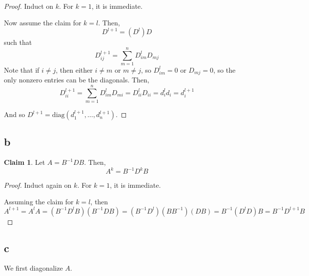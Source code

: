 \documentclass[12pt,letterpaper]{article}
\theoremstyle{definition}
\newtheorem*{claim}{Claim}
\newcommand{\diag}{\mathrm{diag}}
\begin{document}
\begin{proof}
  Induct on $k$. For $k = 1$, it is immediate.

  Now assume the claim for $k = l$. Then,
  \[
    D^{l+1} = (D^l)D
  \]
  such that
  \[
    D^{l+1}_{ij} = \sum_{m=1}^nD^l_{im}D_{mj}
  \]
  Note that if $i \neq j$, then either $i \neq m$ or $m \neq j$, so $D^l_{im} =
  0$ or $D_{mj} = 0$, so the only nonzero entries can be the diagonals. Then,
  \[
    D^{l+1}_{ii} = \sum_{m=1}^nD^l_{im}D_{mi} = D^l_{ii}D_{ii} = d_i^ld_i = d_i^{l+1}
  \]
  
  And so $D^{l+1} = \diag({d_1^{l+1},\dots, d_n^{l+1}})$.
  
\end{proof}

\subsection*{b}

\begin{claim}
  Let $A = B^{-1}DB$. Then,
  \[
    A^k = B^{-1}D^kB
  \]
\end{claim}

\begin{proof}
  Induct again on $k$. For $k = 1$, it is immediate.

  Assuming the claim for $k = l$, then
  \[
    A^{l+1} = A^{l}A = (B^{-1}D^lB)(B^{-1}DB) = (B^{-1}D^l)(BB^{-1})(DB) =
    B^{-1}(D^lD)B = B^{-1}D^{l+1}B
  \]
\end{proof}

\subsection*{c}

We first diagonalize $A$.
\end{document}
